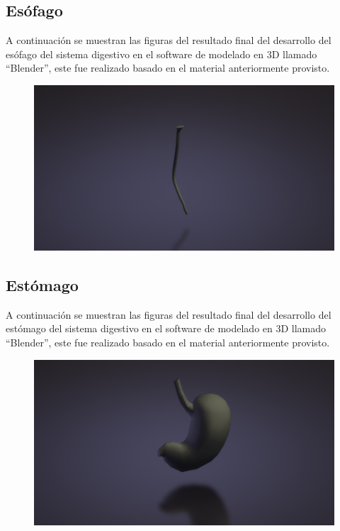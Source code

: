 \subsection{Esófago}
A continuación se muestran las figuras del resultado final del desarrollo del esófago del sistema digestivo en el software de modelado en 3D llamado “Blender”, este fue realizado basado en el material anteriormente provisto.\\
\begin{figure}[H]
	\begin{center}
 		\includegraphics[width = .5\textwidth]{source/images/image25.png}
	\end{center} 
\end{figure}

\subsection{Estómago}
A continuación se muestran las figuras del resultado final del desarrollo del estómago del sistema digestivo en el software de modelado en 3D llamado “Blender”, este fue realizado basado en el material anteriormente provisto.\\
\begin{figure}[H]
	\begin{center}
 		\includegraphics[width = .5\textwidth]{source/images/image42.png}
	\end{center} 
\end{figure}

